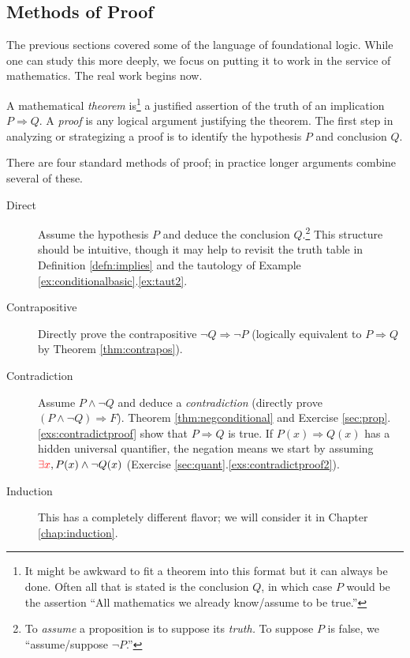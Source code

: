 \clearpage



\subsection{Methods of Proof}\label{sec:proof}

The previous sections covered some of the language of foundational logic. While one can study this more deeply, we focus on putting it to work in the service of mathematics. The real work begins now.\medbreak

A mathematical \emph{theorem} is\footnote{It might be awkward to fit a theorem into this format but it can always be done. Often all that is stated is the conclusion $Q$, in which case $P$ would be the assertion ``All mathematics we already know/assume to be true.''} a justified assertion of the truth of an implication $P\Longrightarrow Q$. A \emph{proof} is any logical argument justifying the theorem. The first step in analyzing or strategizing a proof is to identify the hypothesis $P$ and conclusion $Q$.\medbreak 

There are four standard methods of proof; in practice longer arguments combine several of these.
\begin{description}
	\item[Direct] Assume the hypothesis $P$ and deduce the conclusion $Q$.\footnote{To \emph{assume} a proposition is to suppose its \emph{truth.} To suppose $P$ is false, we ``assume/suppose $\neg P$.''} This structure should be intuitive, though it may help to revisit the truth table in Definition \ref{defn:implies} and the tautology of Example \ref*{ex:conditionalbasic}.\ref{ex:taut2}.
	\item[Contrapositive] Directly prove the contrapositive $\neg Q\Longrightarrow\neg P$ (logically equivalent to $P\Longrightarrow Q$ by Theorem \ref{thm:contrapos}).
	\item[Contradiction] Assume $P\wedge\neg Q$ and deduce a \emph{contradiction} (directly prove $(P\wedge\neg Q)\Rightarrow F$). Theorem \ref{thm:negconditional} and Exercise \ref*{sec:prop}.\ref{exs:contradictproof} show that $P\Longrightarrow Q$ is true.	If $P(x)\Longrightarrow Q(x)$ has a hidden universal quantifier, the negation means we start by assuming $\textcolor{red}{\exists x}, P(x)\wedge\neg Q(x)$ (Exercise \ref*{sec:quant}.\ref{exs:contradictproof2}).
	\item[Induction] This has a completely different flavor; we will consider it in Chapter \ref{chap:induction}.
\end{description}

